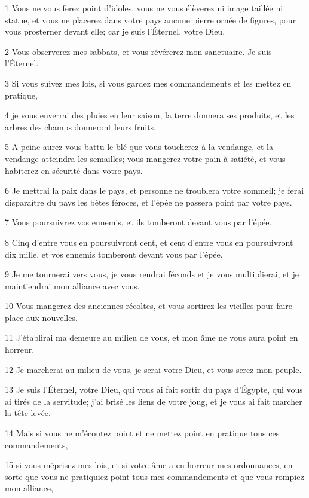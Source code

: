 \par 1 Vous ne vous ferez point d'idoles, vous ne vous élèverez ni image taillée ni statue, et vous ne placerez dans votre pays aucune pierre ornée de figures, pour vous prosterner devant elle; car je suis l'Éternel, votre Dieu.
\par 2 Vous observerez mes sabbats, et vous révérerez mon sanctuaire. Je suis l'Éternel.
\par 3 Si vous suivez mes lois, si vous gardez mes commandements et les mettez en pratique,
\par 4 je vous enverrai des pluies en leur saison, la terre donnera ses produits, et les arbres des champs donneront leurs fruits.
\par 5 A peine aurez-vous battu le blé que vous toucherez à la vendange, et la vendange atteindra les semailles; vous mangerez votre pain à satiété, et vous habiterez en sécurité dans votre pays.
\par 6 Je mettrai la paix dans le pays, et personne ne troublera votre sommeil; je ferai disparaître du pays les bêtes féroces, et l'épée ne passera point par votre pays.
\par 7 Vous poursuivrez vos ennemis, et ils tomberont devant vous par l'épée.
\par 8 Cinq d'entre vous en poursuivront cent, et cent d'entre vous en poursuivront dix mille, et vos ennemis tomberont devant vous par l'épée.
\par 9 Je me tournerai vers vous, je vous rendrai féconds et je vous multiplierai, et je maintiendrai mon alliance avec vous.
\par 10 Vous mangerez des anciennes récoltes, et vous sortirez les vieilles pour faire place aux nouvelles.
\par 11 J'établirai ma demeure au milieu de vous, et mon âme ne vous aura point en horreur.
\par 12 Je marcherai au milieu de vous, je serai votre Dieu, et vous serez mon peuple.
\par 13 Je suis l'Éternel, votre Dieu, qui vous ai fait sortir du pays d'Égypte, qui vous ai tirés de la servitude; j'ai brisé les liens de votre joug, et je vous ai fait marcher la tête levée.
\par 14 Mais si vous ne m'écoutez point et ne mettez point en pratique tous ces commandements,
\par 15 si vous méprisez mes lois, et si votre âme a en horreur mes ordonnances, en sorte que vous ne pratiquiez point tous mes commandements et que vous rompiez mon alliance,
